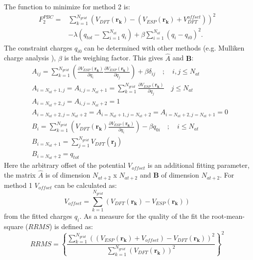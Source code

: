 The function to minimize for method 2 is:
\begin{align}
 F_2^{PBC}=&\sum_{k=1}^{N_{grid}}\left(V_{DFT}(\mathbf{r_k})-\left(V_{ESP}(\mathbf{r_k})+V_{DFT}^{offset}\right)\right)^2\\\nonumber
           &-\lambda\left(q_{tot}-\sum_{i=1}^{N_{at}}q_i\right)+\beta\sum_{i=1}^{N_{at}}\left(q_i-q_{i0}\right)^2. \label{F_esp_pbc2}
\end{align}
The constraint charges $q_{i0}$ can be determined with other methods (e.g. Mulliken charge analysis \cite{Mulliken55}), $\beta$ is the 
weighing factor. This gives $\hat{A}$ and $\mathbf{B}$:
\begin{align}
 &A_{ij}=\sum_{k=1}^{N_{grid}}\left(\frac{\partial V_{ESP}(\mathbf{r_k})}{\partial q_i}\frac{\partial V_{ESP}(\mathbf{r_k})}{\partial q_j}\right)+\beta\delta_{ij} \quad\mathrm{;}\quad i,j\leq N_{at}\\\nonumber
 &A_{i=N_{at}+1,j}=A_{i,j=N_{at}+1}=\sum_{k=1}^{N_{grid}}\frac{\partial V_{ESP}(\mathbf{r_k})}{\partial q_j}\quad j\leq N_{at}\\\nonumber
 &A_{i=N_{at}+2,j}=A_{i,j=N_{at}+2}=1\\\nonumber
 &A_{i=N_{at}+2,j=N_{at}+2}=A_{i=N_{at}+1,j=N_{at}+2}=A_{i=N_{at}+2,j=N_{at}+1}=0\\\nonumber
 &B_{i}=\sum_{k=1}^{N_{grid}}\left(V_{DFT}(\mathbf{r_k})\frac{\partial V_{ESP}(\mathbf{r_k})}{\partial q_i}\right)-\beta q_{0i} \quad \mathrm{;} \quad i\leq N_{at}\\\nonumber
 &B_{i=N_{at}+1}=\sum_{j=1}^{N_{grid}}V_{DFT}(\mathbf{r_j})\\\nonumber
 &B_{i=N_{at}+2}=q_{tot}\nonumber
\end{align}
Here the arbitrary offset of the potential $V_{offset}$ is an additional fitting parameter, the matrix $\hat{A}$ is of dimension $N_{at+2}$ x $N_{at+2}$ and $\mathbf{B}$  of dimension $N_{at+2}$. 
For method 1 $V_{offset}$ can be calculated as:
\begin{equation}
 V_{offset}=\sum_{k=1}^{N_{grid}}\left( V_{DFT} (\mathbf{r_k})-V_{ESP}(\mathbf{r_k})\right)
\end{equation}
from the fitted charges $q_i$. As a measure for the quality of the fit the root-mean-square ($RRMS$) is defined as:
\begin{equation}
 RRMS=\left\{\frac{\sum_{k=1}^{N_{grid}}\left(\left(V_{ESP}(\mathbf{r_k})+V_{offset}\right)-V_{DFT}(\mathbf{r_k})\right)^2}{\sum_{k=1}^{N_{grid}}\left(V_{DFT}(\mathbf{r_k})\right)^2}\right\}^2
\end{equation}
